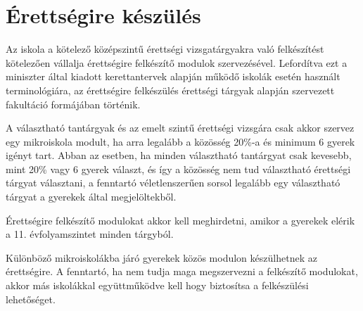 \section{Érettségire készülés}
\label{sec:erettsegi}

Az iskola a kötelező középszintű érettségi vizsgatárgyakra való felkészítést kötelezően vállalja érettségire felkészítő modulok szervezésével. Lefordítva ezt a miniszter által kiadott kerettantervek alapján működő iskolák esetén használt terminológiára, az érettségire felkészülés érettségi tárgyak alapján szervezett fakultáció formájában történik.

A választható tantárgyak és az emelt szintű érettségi vizsgára csak akkor szervez egy mikroiskola modult, ha arra legalább a közösség 20\%-a és minimum 6 gyerek igényt tart. Abban az esetben, ha minden választható tantárgyat csak kevesebb,  mint 20\% vagy 6 gyerek választ, és így a közösség nem tud választható érettségi tárgyat választani, a fenntartó véletlenszerűen sorsol legalább egy választható tárgyat a gyerekek által megjelöltekből.

Érettségire felkészítő modulokat akkor kell meghirdetni, amikor a gyerekek elérik a 11. évfolyamszintet minden tárgyból.

Különböző mikroiskolákba járó gyerekek közös modulon készülhetnek az érettségire. A fenntartó, ha nem tudja maga megszervezni a felkészítő modulokat, akkor más iskolákkal együttműködve kell hogy biztosítsa a felkészülési lehetőséget.